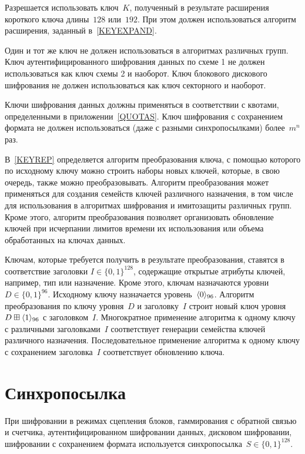 Разрешается использовать ключ~$K$,
полученный в результате расширения короткого ключа длины~$128$ или~$192$. 
При этом должен использоваться алгоритм расширения,
заданный в~\ref{KEYEXPAND}.

Один и тот же ключ не должен использоваться в алгоритмах различных групп. 
%
Ключ аутентифицированного шифрования данных по схеме 1 не должен использоваться 
как ключ схемы 2 и наоборот.
%
Ключ блокового дискового шифрования не должен использоваться как ключ 
секторного и наоборот.

Ключи шифрования данных должны применяться в соответствии с квотами,
определенными в приложении~\ref{QUOTAS}.
%
Ключ шифрования с сохранением формата не должен использоваться 
(даже с разными синхропосылками) более~$m^n$ раз.

В~\ref{KEYREP} определяется алгоритм преобразования ключа, 
с помощью которого по исходному ключу можно строить наборы новых ключей,
которые, в свою очередь, также можно преобразовывать.
%
Алгоритм преобразования может применяться для создания семейств ключей 
различного назначения, в том числе для использования в алгоритмах 
шифрования и имитозащиты различных групп.
%
Кроме этого, алгоритм преобразования позволяет организовать
обновление ключей при исчерпании лимитов времени их использования 
или объема обработанных на ключах данных.

Ключам, которые требуется получить в результате преобразования, 
ставятся в соответствие заголовки $I\in\{0,1\}^{128}$,
содержащие открытые атрибуты ключей, например, тип или назначение.
%
Кроме этого, ключам назначаются уровни~$D\in\{0,1\}^{96}$.
%
Исходному ключу назначается уровень~$\langle0\rangle_{96}$.
%
Алгоритм преобразования по ключу уровня~$D$ и заголовку~$I$
строит новый ключ уровня~$D\boxplus\langle1\rangle_{96}$
с заголовком~$I$.
%
Многократное применение алгоритма к одному ключу с различными 
заголовками~$I$ соответствует генерации семейства ключей 
различного назначения.
%
Последовательное применение алгоритма к одному ключу 
с сохранением заголовка~$I$ соответствует обновлению ключа.

\section{Синхропосылка}\label{COMMON.IV}

При шифровании в режимах сцепления блоков, гаммирования 
с обратной связью и счетчика, аутентифицированном шифровании данных, 
дисковом шифровании, шифровании с сохранением формата
используется синхропосылка~$S\in\{0,1\}^{128}$.

